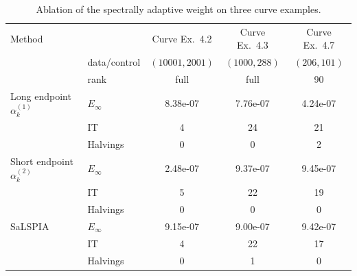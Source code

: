 \begin{table}[H]
\centering
\caption{Ablation of the spectrally adaptive weight on three curve examples.}
\label{tab:abl_weight}
\begin{tabular}{llccc}
\hline
Method & & Curve Ex.~4.2 & Curve Ex.~4.3 & Curve Ex.~4.7 \\
& data/control & $(10001,2001)$ & $(1000,288)$ & $(206,101)$ \\
& rank & full & full & 90 \\
\hline
Long endpoint $\alpha_k^{(1)}$ & $E_\infty$ & 8.38e-07 & 7.76e-07 & 4.24e-07 \\
& IT & 4 & 24 & 21 \\
& Halvings & 0 & 0 & 2 \\
Short endpoint $\alpha_k^{(2)}$ & $E_\infty$ & 2.48e-07 & 9.37e-07 & 9.45e-07 \\
& IT & 5 & 22 & 19 \\
& Halvings & 0 & 0 & 0 \\
SaLSPIA & $E_\infty$ & 9.15e-07 & 9.00e-07 & 9.42e-07 \\
& IT & 4 & 22 & 17 \\
& Halvings & 0 & 1 & 0 \\
\hline
\end{tabular}
\end{table}
